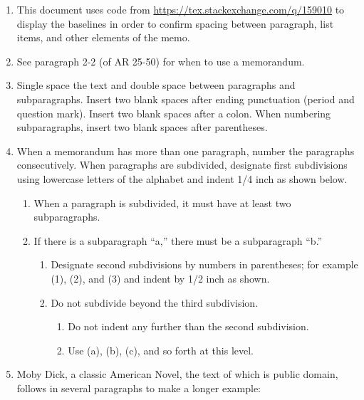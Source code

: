 \documentclass{armymemo}
\author{John Doe}\rank{CPT}\branch{CY}
\begin{document}
\begin{enumerate}
\item This document uses code from \url{https://tex.stackexchange.com/q/159010}
  to display the baselines in order to confirm spacing between paragraph, list
  items, and other elements of the memo.
\item See paragraph 2-2 (of AR 25-50) for when to use a memorandum.
\item Single space the text and double space between paragraphs and subparagraphs. Insert two blank spaces after ending punctuation (period and question mark). Insert two blank spaces after a colon. When numbering subparagraphs, insert two blank spaces after parentheses.
\item When a memorandum has more than one paragraph, number the paragraphs consecutively. When paragraphs are subdivided, designate first subdivisions using lowercase letters of the alphabet and indent 1/4 inch as shown below.
  \begin{enumerate}
  \item When a paragraph is subdivided, it must have at least two subparagraphs.
  \item If there is a subparagraph ``a,'' there must be a subparagraph ``b.''
    \begin{enumerate}
    \item Designate second subdivisions by numbers in parentheses; for example (1), (2), and (3) and indent by 1/2 inch as shown.
    \item Do not subdivide beyond the third subdivision.
      \begin{enumerate}
      \item Do not indent any further than the second subdivision.
      \item Use (a), (b), (c), and so forth at this level.
      \end{enumerate}
    \end{enumerate}
  \end{enumerate}
\item Moby Dick, a classic American Novel, the text of which is public domain,
  follows in several paragraphs to make a longer example:


\end{enumerate}
\end{document}
